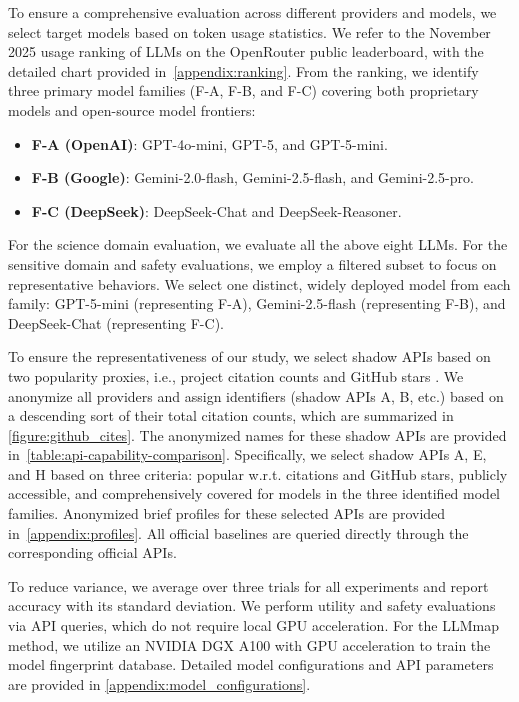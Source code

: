 \documentclass[letterpaper,twocolumn,10pt]{article}
\begin{document}
To ensure a comprehensive evaluation across different providers and models, we select target models based on token usage statistics. 
We refer to the November 2025 usage ranking of LLMs on the OpenRouter public leaderboard, with the detailed chart provided in~\cref{appendix:ranking}.
From the ranking, we identify three primary model families (F-A, F-B, and F-C) covering both proprietary models and open-source model frontiers:
\begin{itemize}
    \item \textbf{F-A (OpenAI)}: GPT-4o-mini, GPT-5, and GPT-5-mini.
    \item \textbf{F-B (Google)}: Gemini-2.0-flash, Gemini-2.5-flash, and Gemini-2.5-pro.
    \item \textbf{F-C (DeepSeek)}: DeepSeek-Chat and DeepSeek-Reasoner.
\end{itemize}
For the science domain evaluation, we evaluate all the above eight LLMs.
For the sensitive domain and safety evaluations, we employ a filtered subset to focus on representative behaviors.
We select one distinct, widely deployed model from each family:
GPT-5-mini (representing F-A), Gemini-2.5-flash (representing F-B), and DeepSeek-Chat (representing F-C).

To ensure the representativeness of our study, we select shadow APIs based on two popularity proxies, i.e., project citation counts and GitHub stars \cite{BHV16}.
We anonymize all providers and assign identifiers (shadow APIs A, B, etc.) based on a descending sort of their total citation counts, which are summarized in \autoref{figure:github_cites}.
The anonymized names for these shadow APIs are provided in~\autoref{table:api-capability-comparison}.
Specifically, we select shadow APIs A, E, and H based on three criteria: popular w.r.t. citations and GitHub stars, publicly accessible, and comprehensively covered for models in the three identified model families.
Anonymized brief profiles for these selected APIs are provided in~\cref{appendix:profiles}.
All official baselines are queried directly through the corresponding official APIs.

To reduce variance, we average over three trials for all experiments and report accuracy with its standard deviation.
We perform utility and safety evaluations via API queries, which do not require local GPU acceleration. 
For the LLMmap method, we utilize an NVIDIA DGX A100 with GPU acceleration to train the model fingerprint database.
Detailed model configurations and API parameters are provided in \cref{appendix:model_configurations}.
\end{document}
